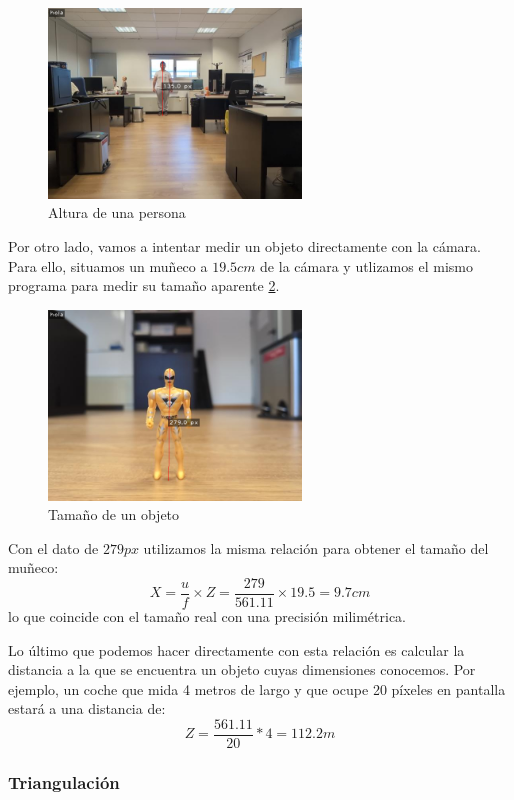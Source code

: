 \documentclass[12pt]{article}
\begin{document}
\begin{figure}[H]
    \centering
    \includegraphics[width=0.6\textwidth]{images_calibracion/Altura_persona.png}  
    \caption{Altura de una persona}
    \label{fig:altura_persona}
\end{figure}

Por otro lado, vamos a intentar medir un objeto directamente con la cámara.
Para ello, situamos un muñeco a $19.5cm$ de la cámara y utlizamos el mismo programa para medir su tamaño aparente \ref{fig:altura_objeto}.
\begin{figure}[H]
    \centering
    \includegraphics[width=0.6\textwidth]{images_calibracion/Altura_objeto.png}  
    \caption{Tamaño de un objeto}
    \label{fig:altura_objeto}
\end{figure}
Con el dato de $279px$ utilizamos la misma relación para obtener el tamaño del muñeco:
$$X = \frac{u}{f} \times Z= \frac{279}{561.11} \times 19.5 = 9.7 cm$$
lo que coincide con el tamaño real con una precisión milimétrica.

Lo último que podemos hacer directamente con esta relación es calcular la distancia a la que se encuentra un objeto cuyas dimensiones conocemos. Por ejemplo, un coche que mida 4 metros de largo y que ocupe 20 píxeles en pantalla estará a una distancia de:
$$
Z=\frac{561.11}{20}*4=112.2m
$$

\subsubsection{Triangulación}
\end{document}
